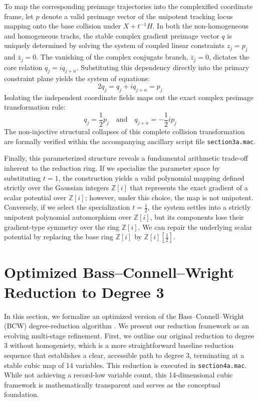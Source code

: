 \documentclass[11pt,a4paper]{article}
\begin{document}
To map the corresponding preimage trajectories into the complexified coordinate frame, let $p$ denote a valid preimage vector of the unipotent tracking locus mapping onto the base collision under $X + t^{-1}H$. In both the non-homogeneous and homogeneous tracks, the stable complex gradient preimage vector $q$ is uniquely determined by solving the system of coupled linear constraints $z_j = p_j$ and $\bar{z}_j = 0$. The vanishing of the complex conjugate branch, $\bar{z}_j = 0$, dictates the core relation $q_j = i q_{j+n}$. Substituting this dependency directly into the primary constraint plane yields the system of equations:
\begin{equation}
2 q_j = q_j + i q_{j+n} = p_j
\end{equation}
Isolating the independent coordinate fields maps out the exact complex preimage transformation rule:
\begin{equation}
q_j = \frac{1}{2} p_j \quad \text{and} \quad q_{j+n} = -\frac{1}{2} i p_j
\end{equation}
The non-injective structural collapses of this complete collision transformation are formally verified within the accompanying ancillary script file \texttt{section3a.mac}.

Finally, this parameterized structure reveals a fundamental arithmetic trade-off inherent to the reduction ring. If we specialize the parameter space by substituting $t = 1$, the construction yields a valid polynomial mapping defined strictly over the Gaussian integers $\mathbb{Z}[i]$ that represents the exact gradient of a scalar potential over $\mathbb{Z}[i]$; however, under this choice, the map is not unipotent. Conversely, if we select the specialization $t = \frac{1}{2}$, the system settles into a strictly unipotent polynomial automorphism over $\mathbb{Z}[i]$, but its components lose their gradient-type symmetry over the ring $\mathbb{Z}[i]$. We can repair the underlying scalar potential by replacing the base ring $\mathbb{Z}[i]$ by $\mathbb{Z}[i][\frac12]$.


\section{Optimized Bass--Connell--Wright Reduction to Degree 3}
\label{sec:bcw_optimized}

In this section, we formalize an optimized version of the Bass--Connell--Wright (BCW) degree-reduction algorithm \cite{BCW1982}. We present our reduction framework as an evolving multi-stage refinement. First, we outline our original reduction to degree 3 without homogeniety, which is a more straightforward baseline reduction sequence that establishes a clear, accessible path to degree 3, terminating at a stable cubic map of 14 variables. This reduction is executed in \texttt{section4a.mac}. While not achieving a record-low variable count, this 14-dimensional cubic framework is mathematically transparent and serves as the conceptual foundation. 
\end{document}
